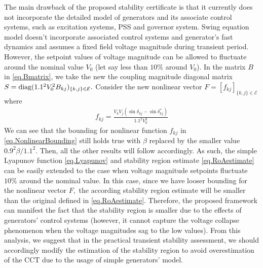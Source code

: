 \documentclass[final]{IEEEtran}
\begin{document}
\begin{remark} The main drawback of the proposed
stability certificate is that it currently does not incorporate
the detailed model of generators and its associate control
systems, such as excitation systems, PSS and governor system.
Swing equation model doesn't incorporate associated control
systems and generator's fast dynamics and assumes a fixed field
voltage magnitude during transient period. However, the setpoint
values of voltage magnitude can be allowed to fluctuate around the
nominal value $V_0$ (let say less than $10\%$ around $V_0$). In
the matrix $B$ in \eqref{eq.Bmatrix}, we take the new the coupling
magnitude diagonal matrix
$S=\emph{\emph{diag}}(1.1^2V_0^2B_{kj})_{\{k,j\}\in \mathcal{E}}.$
Consider the new nonlinear vector
$F=[f_{kj}]_{\{k,j\}\in\mathcal{E}}$ where
\begin{align}
f_{kj}=\frac{V_kV_j(\sin\delta_{kj}-\sin\delta^*_{kj})}{1.1^2V_0^2}
\end{align}
We can see that the bounding for nonlinear function $f_{kj}$ in
\eqref{eq.NonlinearBounding} still holds true with $\beta$
replaced by the smaller value $ 0.9^2\beta/1.1^2.$ Then, all the
other results will follow accordingly. As such, the simple
Lyapunov function  \eqref{eq.Lyapunov} and stability region
estimate \eqref{eq.RoAestimate} can be easily extended to the case
when voltage magnitude setpoints fluctuate $10\%$ around the
nominal value. In this case, since we have looser bounding for the
nonlinear vector $F,$ the according stability region estimate will
be smaller than the original defined in \eqref{eq.RoAestimate}.
Therefore, the proposed framework can manifest the fact that the
stability region is smaller due to the effects of generators'
control systems (however, it cannot capture the  voltage collapse
phenomenon  when the voltage magnitudes sag to the low values).
From this analysis, we suggest that in the practical transient stability assessment, we should accordingly modify the estimation of the stability region to avoid overestimation of the CCT
due to the usage of simple generators' model.
\end{remark}
\end{document}
